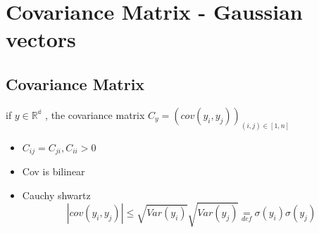 \section{Covariance Matrix - Gaussian vectors}


\subsection{Covariance Matrix}

\begin{de}

if $y\in\mathbb{R^{d}}$ , the covariance matrix $C_{y}=(cov(y_{i},y_{j}))_{(i,j)\in[1,n]}$

\end{de}

\begin{prop}
\begin{itemize}
\item $C_{ij}=C_{ji},C_{ii}>0$
\item Cov is bilinear
\item Cauchy shwartz\\
\[
|cov(y_{i},y_{j})|\leq\sqrt{Var(y_{i})}\sqrt{Var(y_{j})}\underset{def}{=}\sigma(y_{i})\sigma(y_{j})
\]

\end{itemize}
\end{prop}
